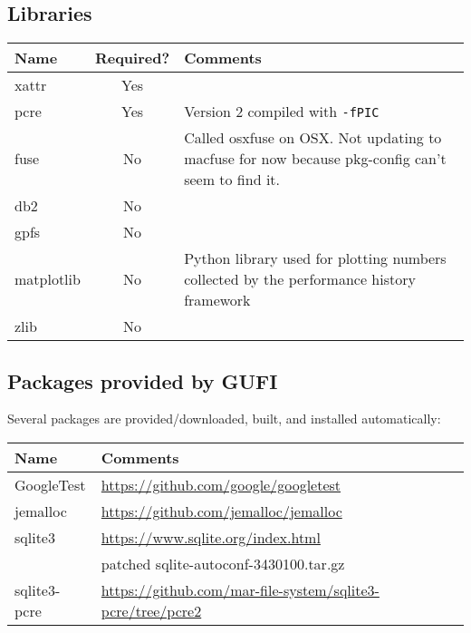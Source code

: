 \subsection{Libraries}
\begin{tabularx}{\textwidth}{| l | c | X |}
  \hline
  Name & Required? & Comments \\
  \hline
  xattr & Yes & \\
  \hline
  pcre & Yes & Version 2 compiled with \texttt{-fPIC} \\
  \hline
  fuse & No & Called osxfuse on OSX. Not updating to macfuse for now
  because pkg-config can't seem to find it. \\
  \hline
  db2 & No & \\
  \hline
  gpfs & No & \\
  \hline
  matplotlib & No & Python library used for plotting numbers collected
  by the performance history framework \\
  \hline
  zlib & No & \\
  \hline
\end{tabularx}

\subsection{Packages provided by GUFI}
Several packages are provided/downloaded, built, and installed
automatically:
\begin{tabularx}{\textwidth}{| l | X |}
  \hline
  Name & Comments \\
  \hline
  GoogleTest & \url{https://github.com/google/googletest} \\
  \hline
  jemalloc & \url{https://github.com/jemalloc/jemalloc} \\
  \hline
  sqlite3 & \url{https://www.sqlite.org/index.html} \\
  & patched sqlite-autoconf-3430100.tar.gz \\
  \hline
  sqlite3-pcre & \url{https://github.com/mar-file-system/sqlite3-pcre/tree/pcre2}
  \\
  \hline
\end{tabularx}
